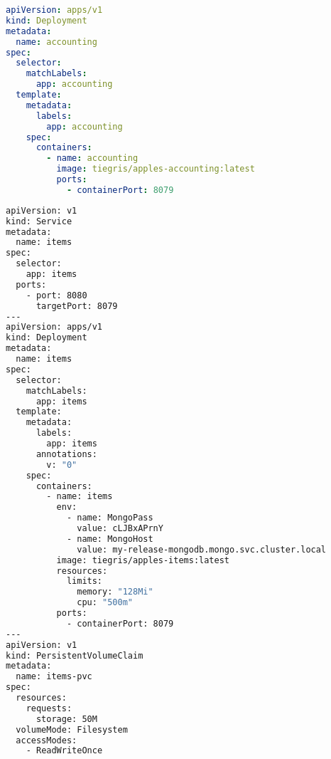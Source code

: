 \begin{lstlisting}[caption={accounting.yaml},language=YAML,label=appendix:todo]
apiVersion: apps/v1
kind: Deployment
metadata:
  name: accounting
spec:
  selector:
    matchLabels:
      app: accounting
  template:
    metadata:
      labels:
        app: accounting
    spec:
      containers:
        - name: accounting
          image: tiegris/apples-accounting:latest
          ports:
            - containerPort: 8079
\end{lstlisting}

\begin{lstlisting}[caption={items.yaml},language=bash,label=appendix:YAML]
apiVersion: v1
kind: Service
metadata:
  name: items
spec:
  selector:
    app: items
  ports:
    - port: 8080
      targetPort: 8079
---
apiVersion: apps/v1
kind: Deployment
metadata:
  name: items
spec:
  selector:
    matchLabels:
      app: items
  template:
    metadata:
      labels:
        app: items
      annotations:
        v: "0"
    spec:
      containers:
        - name: items
          env:
            - name: MongoPass
              value: cLJBxAPrnY
            - name: MongoHost
              value: my-release-mongodb.mongo.svc.cluster.local
          image: tiegris/apples-items:latest
          resources:
            limits:
              memory: "128Mi"
              cpu: "500m"
          ports:
            - containerPort: 8079
---
apiVersion: v1
kind: PersistentVolumeClaim
metadata:
  name: items-pvc
spec:
  resources:
    requests:
      storage: 50M
  volumeMode: Filesystem
  accessModes:
    - ReadWriteOnce
\end{lstlisting}

\begin{lstlisting}[caption={TODO},language=bash,label=appendix:YAML]

\end{lstlisting}

\begin{lstlisting}[caption={TODO},language=bash,label=appendix:YAML]

\end{lstlisting}

\begin{lstlisting}[caption={TODO},language=bash,label=appendix:YAML]

\end{lstlisting}

\begin{lstlisting}[caption={TODO},language=bash,label=appendix:YAML]

\end{lstlisting}

